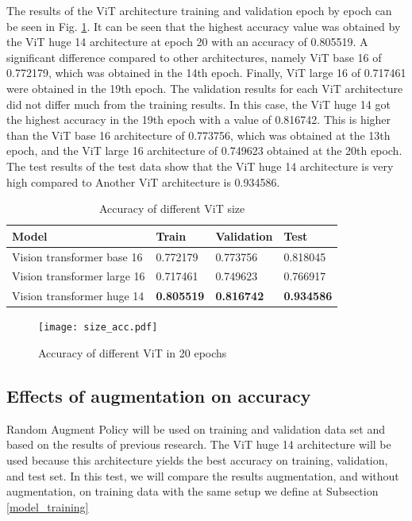 \documentclass{article}
\begin{document}
The results of the ViT architecture training and validation epoch by epoch can be seen in Fig. \ref{size_acc_fig}. It can be seen that the highest accuracy value was obtained by the ViT huge 14 architecture at epoch 20 with an accuracy of 0.805519. A significant difference compared to other architectures, namely ViT base 16 of 0.772179, which was obtained in the 14th epoch. Finally, ViT large 16 of 0.717461 were obtained in the 19th epoch. The validation results for each ViT architecture did not differ much from the training results. In this case, the ViT huge 14 got the highest accuracy in the 19th epoch with a value of 0.816742. This is higher than the ViT base 16 architecture of 0.773756, which was obtained at the 13th epoch, and the ViT large 16 architecture of 0.749623 obtained at the 20th epoch. The test results of the test data show that the ViT huge 14 architecture is very high compared to Another ViT architecture is 0.934586.

\begin{table}[!b]
	\caption{Accuracy of different ViT size}
	\label{size_acc_table}
	\centering
	\begin{tabular}{p{4cm}|p{2cm}p{2cm}p{2cm}}
		Model & Train & Validation & Test \\
		\hline
		Vision transformer base 16 &
		0.772179 &
		0.773756 &
		0.818045 \\
		Vision transformer large 16 &
		0.717461 &
		0.749623 &
		0.766917 \\
		Vision transformer huge 14 &
		\textbf{0.805519} &
		\textbf{0.816742} &
		\textbf{0.934586} \\
	\end{tabular}
\end{table}

\begin{figure}[!b]
	\centering
	\texttt{[image: size\_acc.pdf]}
	\caption{Accuracy of different ViT in 20 epochs}
	\label{size_acc_fig}
\end{figure}

\subsection{Effects of augmentation on accuracy}
Random Augment Policy will be used on training and validation data set and based on the results of previous research. The ViT huge 14 architecture will be used because this architecture yields the best accuracy on training, validation, and test set. In this test, we will compare the results augmentation, and without augmentation, on training data with the same setup we define at Subsection \ref{model_training}
\end{document}
